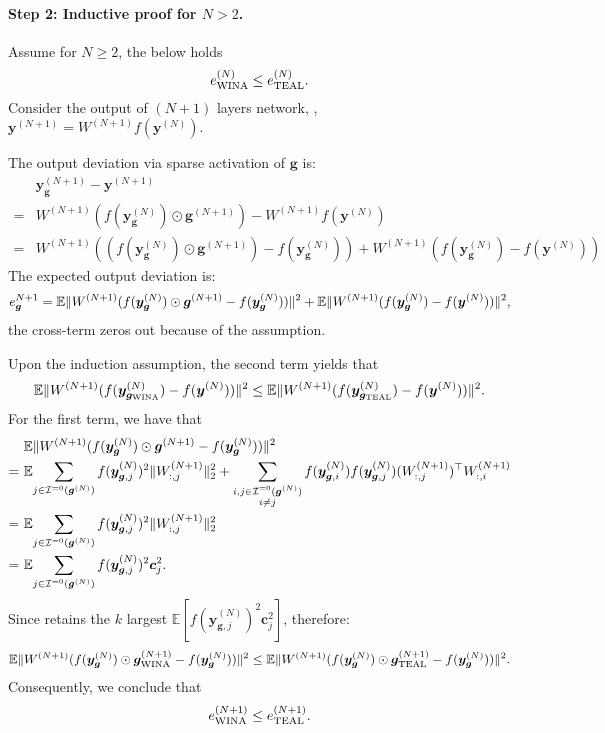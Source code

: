 \paragraph{Step 2: Inductive proof for $N>2$.}
Assume for $N\ge2$, the below holds
$$
e_\text{\algacro{}}^{(N)}\leq e_\text{TEAL}^{(N)}.
$$
Consider the output of $(N+1)$ layers network, \ie, $\bm{y}^{(N+1)} = W^{(N+1)} f(\bm{y}^{(N)})$.

The output deviation via sparse activation of $\bm{g}$ is:
\begin{align*}
	&\bm{y}_{\bm{g}}^{(N+1)} - \bm{y}^{(N+1)} \\
	=& W^{(N+1)}(f(\bm{y}_{\bm{g}}^{(N)}) \odot \bm{g}^{(N+1)}) - W^{(N+1)}f(\bm{y}^{(N)}) \\
	=&W^{(N+1)}((f(\bm{y}_{\bm{g}}^{(N)}) \odot \bm{g}^{(N+1)} ) - f(\bm{y}_{\bm{g}}^{(N)})) + W^{(N+1)}(f(\bm{y}_{\bm{g}}^{(N)}) - f(\bm{y}^{(N)}))
\end{align*}
The expected output deviation is:
\begin{equation}
	e_{\bm{g}}^{N+1}=\E\|W^{(N+1)}(f(\bm{y}_{\bm{g}}^{(N)}) \odot \bm{g}^{(N+1)} - f(\bm{y}_{\bm{g}}^{(N)}))\|^2 + \E\|W^{(N+1)}(f(\bm{y}_{\bm{g}}^{(N)}) - f(\bm{y}^{(N)}))\|^2,
\end{equation}
the cross-term zeros out because of the assumption. 

Upon the induction assumption, the second term yields that 
\begin{equation}
	\E\|W^{(N+1)}(f(\bm{y}_{\bm{g}_\text{\algacro{}}}^{(N)}) - f(\bm{y}^{(N)}))\|^2 \leq \E\|W^{(N+1)}(f(\bm{y}_{\bm{g}_\text{TEAL}}^{(N)}) - f(\bm{y}^{(N)}))\|^2.
\end{equation}
For the first term, we have that 
\begin{align*}
	&\ \E\|W^{(N+1)}(f(\bm{y}_{\bm{g}}^{(N)}) \odot \bm{g}^{(N+1)} - f(\bm{y}_{\bm{g}}^{(N)}))\|^2\\
	=&\ \E{\sum_{j\in \mathcal{I}^{=0}(\bm{g}^{(N)})} f(\bm{y}_{\bm{g},j}^{(N)})^2\|W_{:,j}^{(N+1)}\|_2^2
		+ \sum_{\substack{i,j\in \mathcal{I}^{=0}(\bm{g}^{(N)})\\i\neq j}}
		f(\bm{y}_{\bm{g},i}^{(N)})f(\bm{y}_{\bm{g},j}^{(N)})(W^{(N+1)}_{:,j})^\top W_{:,i}^{(N+1)}}\\
	=&\ \E{\sum_{j\in \mathcal{I}^{=0}(\bm{g}^{(N)})} f(\bm{y}_{\bm{g},j}^{(N)})^2\|W_{:,j}^{(N+1)}\|_2^2}\\
	=&\ \E{\sum_{j\in \mathcal{I}^{=0}(\bm{g}^{(N)})} f(\bm{y}_{\bm{g},j}^{(N)})^2\bm{c}_j^2}.
\end{align*}
Since \algacro{} retains the $k$ largest $\mathbb{E}[f(\bm{y}_{\bm{g},j}^{(N)})^2\bm{c}_j^2]$, therefore:
$$
\E\|W^{(N+1)}(f(\bm{y}_{\bm{g}}^{(N)}) \odot \bm{g}_\text{\algacro{}}^{(N+1)} - f(\bm{y}_{\bm{g}}^{(N)}))\|^2\leq \E\|W^{(N+1)}(f(\bm{y}_{\bm{g}}^{(N)}) \odot \bm{g}_\text{TEAL}^{(N+1)} - f(\bm{y}_{\bm{g}}^{(N)}))\|^2.
$$
Consequently, we conclude that 
$$
e_\text{\algacro{}}^{(N+1)}\leq e_\text{TEAL}^{(N+1)}.
$$